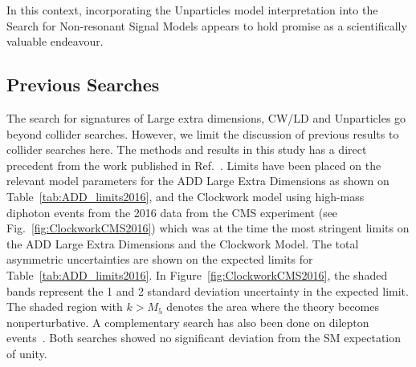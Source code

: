 In this context, incorporating the Unparticles model interpretation into the Search for Non-resonant Signal Models appears to hold promise as a scientifically valuable endeavour.

\subsection{Previous Searches}

The search for signatures of Large extra dimensions, CW/LD and Unparticles go beyond collider searches. However, we limit the discussion of previous results to collider searches here. The methods and results in this study has a direct precedent from the work published in Ref.~\cite{CMS:2018dqv}. Limits have been placed on the relevant model parameters for the ADD Large Extra Dimensions as shown on Table~\ref{tab:ADD_limits2016}, and the Clockwork model using high-mass diphoton events from the 2016 data from the CMS experiment (see Fig.~\ref{fig:ClockworkCMS2016}) which was at the time the most stringent limits on the ADD Large Extra Dimensions and the Clockwork Model. The total asymmetric uncertainties are shown on the expected limits for Table~\ref{tab:ADD_limits2016}. In Figure~\ref{fig:ClockworkCMS2016}, the shaded bands represent the 1 and 2 standard deviation uncertainty in the expected limit. The shaded region with $k > M_5$ denotes the area where the theory becomes nonperturbative. A complementary search has also been done on dilepton events~\cite{CMS:2021ctt}. Both searches showed no significant deviation from the SM expectation of unity.

\begin{table}[pt]
	\centering
	\caption{Exclusion limits on the mass scale \Ms (in units of {\TeVns}) for various conventions used in the calculation of the ADD large extra-dimensional scenario using the 2016 CMS detector data corresponding to an integrated luminosity of 35.9 \fbinv~\cite{CMS:2018dqv}. }
	\label{tab:ADD_limits2016}
\end{table}


